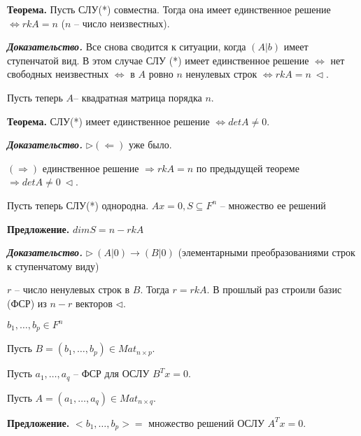 \vspace{\baselineskip}
\textbf{Теорема.} Пусть СЛУ(*) совместна. Тогда она имеет единственное решение $\Leftrightarrow rkA = n$ ($n$ -- число неизвестных). 

\vspace{\baselineskip}
\textbf{\textit{Доказательство.}} Все снова сводится к ситуации, когда $(A|b)$ имеет ступенчатой вид. В этом случае СЛУ (*) имеет единственное решение $\Leftrightarrow$ нет свободных неизвестных $\Leftrightarrow$ в $A$ ровно $n$ ненулевых строк $\Leftrightarrow rkA = n \ \lhd$.

\vspace{\baselineskip}
Пусть теперь $A$-- квадратная матрица порядка $n$.

\vspace{\baselineskip}
\textbf{Теорема.} СЛУ(*) имеет единственное решение $\Leftrightarrow detA \neq 0$.

\vspace{\baselineskip}
\textbf{\textit{Доказательство.}} $\rhd (\Leftarrow)$ уже было.

$(\Rightarrow)$ единственное решение $\Rightarrow rkA = n$ по предыдущей теореме $\Rightarrow detA \neq 0 \ \lhd$.


\vspace{\baselineskip}
Пусть теперь СЛУ(*) однородна. $Ax = 0, S \subseteq F^n$ -- множество ее решений

\vspace{\baselineskip}
\textbf{Предложение.} $dimS = n - rkA$

\vspace{\baselineskip}
\textbf{\textit{Доказательство.}} $\rhd \ (A|0) \rightarrow (B|0)$ (элементарными преобразованиями строк к ступенчатому виду)

\vspace{\baselineskip}
$r$ -- число ненулевых строк в $B$. Тогда $r = rkA$. В прошлый раз строили базис (ФСР) из $n-r$ векторов $\lhd$.

\vspace{\baselineskip}
$b_1, \dots, b_p \in F^n$

Пусть $B = (b_1, \dots, b_p) \in Mat_{n \times p}$.

Пусть $a_1, \dots, a_q$ -- ФСР для ОСЛУ $B^T x = 0$.

Пусть $A = (a_1, \dots, a_q) \in Mat_{n \times q}$.

\vspace{\baselineskip}
\textbf{Предложение.} $<b_1, \dots, b_p> =$ множество решений ОСЛУ $A^T x = 0$.

